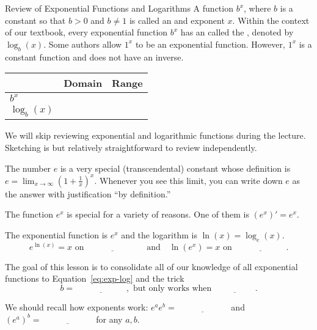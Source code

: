 \documentclass[../main.tex]{subfiles}
\begin{document}
\begin{lesson}{Review of Exponential Functions and Logarithms}
  A function \(b^{x}\), where \(b\) is a constant so that \(b > 0\) and \(b \ne 1\) is called an  and exponent \(x\). Within the context of our textbook, every exponential function \(b^{x}\) has an  called the , denoted by \(\log_{b}(x)\). \newline
  {\scriptsize Some authors allow \(1^{x}\) to be an exponential function. However, \(1^{x}\) is a constant function and does not have an inverse.}

  \begin{center}
    \begin{tabular}{l|p{1in}|p{1in}}
    & Domain & Range \\\midrule
      \(b^{x}\) & & \\\midrule
      \(\log_{b}(x)\) & &
    \end{tabular}
  \end{center}

  \faExclamationTriangle{} We will skip reviewing  exponential and logarithmic functions during the lecture. Sketching is  but relatively straightforward to review independently.


  The number \(e\) is a very special (transcendental) constant whose definition is \(e = \lim_{x \to \infty} \left( 1 + \frac{1}{x} \right)^{x}\). Whenever you see this limit, you can write down \(e\) as the answer with justification ``by definition.''
  \bigskip

  The function \(e^{x}\) is special for a variety of reasons. One of them is \((e^{x})' = e^{x}\).
  \begin{mdframed}[style=simple]
    The  exponential function is \(e^{x}\) and the  logarithm is \(\ln(x) = \log_{e}(x)\).
    \begin{equation} \label{eq:exp-log}
      e^{\ln(x)} = x \text{ on } \underline{\hspace{1in}} \quad\text{and}\quad \ln(e^{x}) = x \text{ on } \underline{\hspace{1in}}.
    \end{equation}

    The goal of this lesson is to consolidate all of our knowledge of all exponential functions to Equation~\eqref{eq:exp-log} and the  trick
    \begin{equation} \label{eq:exp-change-of-base}
      b = \underline{\hspace{1in}}, \text{ but only works when } \underline{\hspace{2cm}}.
    \end{equation}
  \end{mdframed}
  We should recall how exponents work: \(e^{a}e^{b} = \underline{\hspace{1in}}\) and \((e^{a})^{b} = \underline{\hspace{1in}}\) for any \(a,b\).


\end{lesson}
\end{document}

